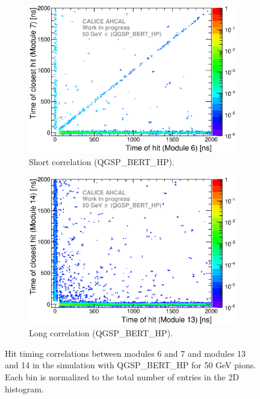 \begin{figure}[htbp!]
	\begin{subfigure}[t]{0.49\textwidth}
		\centering
		\includegraphics[width=1\textwidth]{../Thesis_Plots/Timing/Pions/Plots/ComparisonToSim/Time_Correlation_50GeV_short_QGSPBERTHP.eps}
		\caption{Short correlation (QGSP\_BERT\_HP).} \label{fig:Corr_short_QGSPBERTHP}
	\end{subfigure}
	\hfill
	\begin{subfigure}[t]{0.49\textwidth}
		\centering
		\includegraphics[width=1\textwidth]{../Thesis_Plots/Timing/Pions/Plots/ComparisonToSim/Time_Correlation_50GeV_long_QGSPBERTHP.eps}
		\caption{Long correlation (QGSP\_BERT\_HP).} \label{fig:Corr_long_QGSPBERTHP}
	\end{subfigure}
	\caption{Hit timing correlations between modules 6 and 7 and modules 13 and 14 in the \mokka simulation with QGSP\_BERT\_HP for 50 GeV pions. Each bin is normalized to the total number of entries in the 2D histogram.}
	\label{fig:Corr_Mokka_Simulation}
\end{figure}

